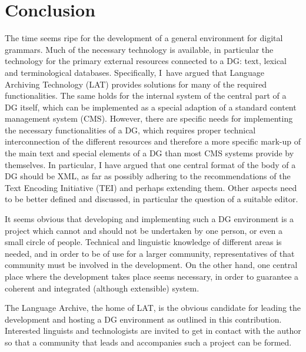\section{Conclusion}

The time seems ripe for the development of a general environment for digital grammars. Much of the necessary technology is available, in particular the technology for the primary external resources connected to a DG: text, lexical and terminological databases. Specifically, I~have argued that Language Archiving Technology (LAT) provides solutions for many of the required functionalities. The same holds for the internal system of the central part of a DG itself, which can be implemented as a special adaption of a standard content management system (CMS). However, there are specific needs for implementing the necessary functionalities of a DG, which requires proper technical interconnection of the different resources and therefore a more specific mark-up of the main text and special elements of a DG than most CMS systems provide by themselves. In particular, I have argued that one central format of the body of a DG should be XML, as far as possibly adhering to the recommendations of the Text Encoding Initiative (TEI) and perhaps extending them. Other aspects need to be better defined and discussed, in particular the question of a suitable editor.

It seems obvious that developing and implementing such a DG environment is a project which cannot and should not be undertaken by one person, or even a small circle of people. Technical and linguistic knowledge of different areas is needed, and in order to be of use for a larger community, representatives of that community must be involved in the development. On the other hand, one central place where the development takes place seems necessary, in order to guarantee a coherent and integrated (although extensible) system.

The Language Archive, the home of LAT, is the obvious candidate for leading the development and hosting a DG environment as outlined in this contribution. Interested linguists and technologists are invited to get in contact with the author so that a community that leads and accompanies such a project can be formed. 



